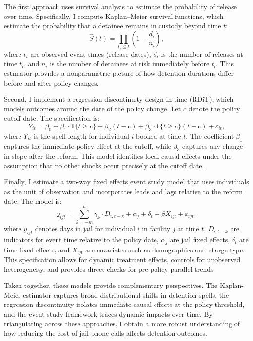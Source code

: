 \documentclass[12pt, a4paper]{article}
\begin{document}
The first approach uses survival analysis to estimate the probability of release over time. Specifically, I compute Kaplan–Meier survival functions, which estimate the probability that a detainee remains in custody beyond time $t$:
\[
\hat{S}(t) = \prod_{t_i \leq t} \left(1 - \frac{d_i}{n_i}\right),
\]
where $t_i$ are observed event times (release dates), $d_i$ is the number of releases at time $t_i$, and $n_i$ is the number of detainees at risk immediately before $t_i$. This estimator provides a nonparametric picture of how detention durations differ before and after policy changes.

Second, I implement a regression discontinuity design in time (RDiT), which models outcomes around the date of the policy change. Let $c$ denote the policy cutoff date. The specification is:
\[
Y_{it} = \beta_0 + \beta_1 \cdot \mathbf{1}\{t \geq c\} + \beta_2 (t - c) + \beta_3 \cdot \mathbf{1}\{t \geq c\}(t - c) + \varepsilon_{it},
\]
where $Y_{it}$ is the spell length for individual $i$ booked at time $t$. The coefficient $\beta_1$ captures the immediate policy effect at the cutoff, while $\beta_3$ captures any change in slope after the reform. This model identifies local causal effects under the assumption that no other shocks occur precisely at the cutoff date.

Finally, I estimate a two-way fixed effects event study model that uses individuals as the unit of observation and incorporates leads and lags relative to the reform date. The model is:
\[
y_{ijt} = \sum_{k=-m}^{n} \gamma_k \cdot D_{i,t-k} + \alpha_j + \delta_t + \beta X_{ijt} + \varepsilon_{ijt},
\]
where $y_{ijt}$ denotes days in jail for individual $i$ in facility $j$ at time $t$, $D_{i,t-k}$ are indicators for event time relative to the policy date, $\alpha_j$ are jail fixed effects, $\delta_t$ are time fixed effects, and $X_{ijt}$ are covariates such as demographics and charge type. This specification allows for dynamic treatment effects, controls for unobserved heterogeneity, and provides direct checks for pre-policy parallel trends.

Taken together, these models provide complementary perspectives. The Kaplan-Meier estimator captures broad distributional shifts in detention spells, the regression discontinuity isolates immediate causal effects at the policy threshold, and the event study framework traces dynamic impacts over time. By triangulating across these approaches, I obtain a more robust understanding of how reducing the cost of jail phone calls affects detention outcomes.
\end{document}
